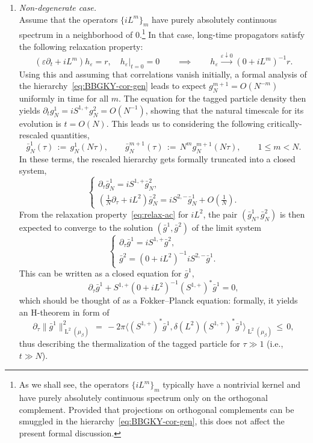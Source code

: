 \documentclass[a4paper,11pt,reqno,noindent]{amsart}
\theoremstyle{plain}
\numberwithin{equation}{section}
\newcommand{\e}{\varepsilon}
\newcommand{\3}{|\!|\!|}
\newcommand{\Ld}{\operatorname{L}}
\begin{document}
\begin{enumerate}[---]
\medskip\item \emph{Non-degenerate case.}\\
Assume that the operators $\{iL^m\}_m$ have purely absolutely continuous spectrum in a neighborhood of $0$.\footnote{As we shall see, the operators $\{iL^m\}_m$ typically have a nontrivial kernel and have purely absolutely continuous spectrum only on the orthogonal complement. Provided that projections on orthogonal complements can be smuggled in the hierarchy~\eqref{eq:BBGKY-cor-gen}, this does not affect the present formal discussion.}
In that case, long-time propagators satisfy the following relaxation property:
\begin{equation}\label{eq:relax-ac}
(\e\partial_t+iL^m)h_\e=r,\quad h_\e|_{t=0}=0\qquad\implies\qquad h_\e\xrightarrow{\e\downarrow0}(0+iL^m)^{-1}r.
\end{equation}
Using this and assuming that correlations vanish initially, a formal analysis of the hierarchy~\eqref{eq:BBGKY-cor-gen} leads to expect $g_N^{m+1}=O(N^{-m})$ uniformly in time for all $m$. The equation for the tagged particle density then yields $\partial_tg_N^1=iS^{1,+}g_N^2=O(N^{-1})$, showing that the natural timescale for its evolution is $t=O(N)$. This leads us to considering the following critically-rescaled quantities,
\[\bar g_N^1(\tau)\,:=\,g_N^1(N\tau),\qquad\bar g_N^{m+1}(\tau)\,:=\,N^{m}g_N^{m+1}(N\tau),\qquad 1\le m< N.\]
In these terms, the rescaled hierarchy gets formally truncated into a closed system,
\[\left\{\begin{array}{lll}
\partial_\tau\bar g_N^1=iS^{1,+}\bar g_N^{2},\\
(\tfrac1N\partial_\tau+iL^2)\bar g_N^2=iS^{2,-}\bar g_N^{1}+O(\tfrac1N).
\end{array}\right.\]
From the relaxation property~\eqref{eq:relax-ac} for $iL^2$, the pair $(\bar g_N^1,\bar g_N^2)$ is then expected to converge to the solution $(\bar g^1,\bar g^2)$ of the limit system
\[\left\{\begin{array}{lll}
\partial_\tau\bar g^1=iS^{1,+}\bar g^{2},\\
\bar g^2=(0+iL^2)^{-1}iS^{2,-}\bar g^{1}.
\end{array}\right.\]
This can be written as a closed equation for $\bar g^1$,
\begin{equation}\label{eq:diff-gen}
\partial_\tau\bar g^1+S^{1,+}(0+iL^2)^{-1}(S^{1,+})^*\bar g^{1}=0,
\end{equation}
which should be thought of as a Fokker--Planck equation: {formally, it yields an H-theorem in form of
\[\partial_\tau\|\bar g^1\|^2_{\Ld^2(\mu_\beta)}\,=\,-2\pi\big\langle (S^{1,+})^*\bar g^1,\delta(L^2)(S^{1,+})^*\bar g^1\big\rangle_{\Ld^2(\mu_\beta)}\,\le\,0,\]
thus describing the thermalization of the tagged particle for $\tau\gg1$ (i.e.,~$t\gg N$).}


\end{enumerate}
\end{document}
